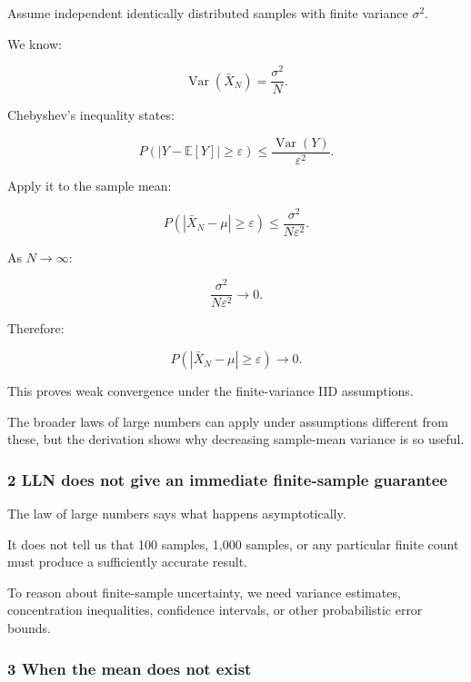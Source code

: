 \hypertarget{02-foundations-ii-ch030-a-derivation-of-the-weak-law-intuition-using-chebyshev}{}

Assume independent identically distributed samples with finite variance \(\sigma^2\).

We know:

\[
 \operatorname{Var}(\bar X_N)=\frac{\sigma^2}{N}.
\]

Chebyshev's inequality states:

\[
 P(|Y-\mathbb E[Y]|\ge\varepsilon) \le \frac{\operatorname{Var}(Y)}{\varepsilon^2}.
\]

Apply it to the sample mean:

\[
 P(|\bar X_N-\mu|\ge\varepsilon) \le \frac{\sigma^2}{N\varepsilon^2}.
\]

As \(N\to\infty\):

\[
 \frac{\sigma^2}{N\varepsilon^2}\to0.
\]

Therefore:

\[
 \boxed{ P(|\bar X_N-\mu|\ge\varepsilon)\to0 }.
\]

This proves weak convergence under the finite-variance IID assumptions.

The broader laws of large numbers can apply under assumptions different from these, but the derivation shows why decreasing sample-mean variance is so useful.

\subsubsection{2 LLN does not give an immediate finite-sample guarantee}\label{02-foundations-ii-ch030-lln-does-not-give-an-immediate-finite-sample-guarantee}

\hypertarget{02-foundations-ii-ch030-lln-does-not-give-an-immediate-finite-sample-guarantee}{}

The law of large numbers says what happens asymptotically.

It does not tell us that 100 samples, 1,000 samples, or any particular finite count must produce a sufficiently accurate result.

To reason about finite-sample uncertainty, we need variance estimates, concentration inequalities, confidence intervals, or other probabilistic error bounds.

\subsubsection{3 When the mean does not exist}\label{02-foundations-ii-ch030-when-the-mean-does-not-exist}

